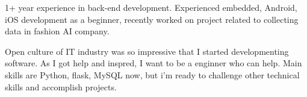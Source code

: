

\begin{cvparagraph}

1+ year experience in back-end development. Experienced embedded, Android, iOS development as a beginner, recently worked on project related to collecting data in fashion AI company. 

Open culture of IT industry was so impressive that I started developmenting software. As I got help and inspred, I want to be a enginner who can help.
Main skills are Python, flask, MySQL now, but i'm ready to challenge other technical skills and accomplish projects.

\end{cvparagraph}
